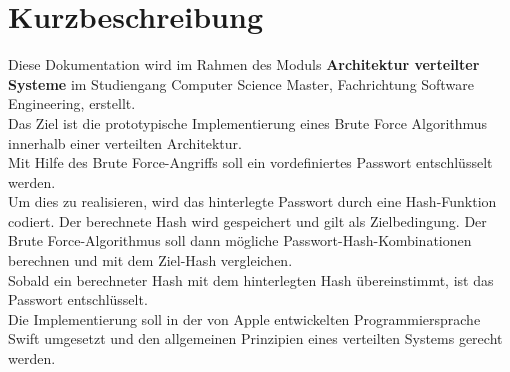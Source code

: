 \chapter*{Kurzbeschreibung}

Diese Dokumentation wird im Rahmen des Moduls \textbf{Architektur verteilter Systeme} im Studiengang Computer Science Master, Fachrichtung Software Engineering, erstellt. \\

Das Ziel ist die prototypische Implementierung eines Brute Force Algorithmus innerhalb einer verteilten Architektur.\\
Mit Hilfe des Brute Force-Angriffs soll ein vordefiniertes Passwort entschlüsselt werden. \\
Um dies zu realisieren, wird das hinterlegte Passwort durch eine Hash-Funktion codiert. Der berechnete Hash wird gespeichert und gilt als Zielbedingung. Der Brute Force-Algorithmus soll dann mögliche Passwort-Hash-Kombinationen berechnen und mit dem Ziel-Hash vergleichen. \\
Sobald ein berechneter Hash mit dem hinterlegten Hash übereinstimmt, ist das Passwort entschlüsselt. \\

Die Implementierung soll in der von Apple\textsuperscript{\textcopyright} entwickelten Programmiersprache Swift umgesetzt und den allgemeinen Prinzipien eines verteilten Systems gerecht werden. 